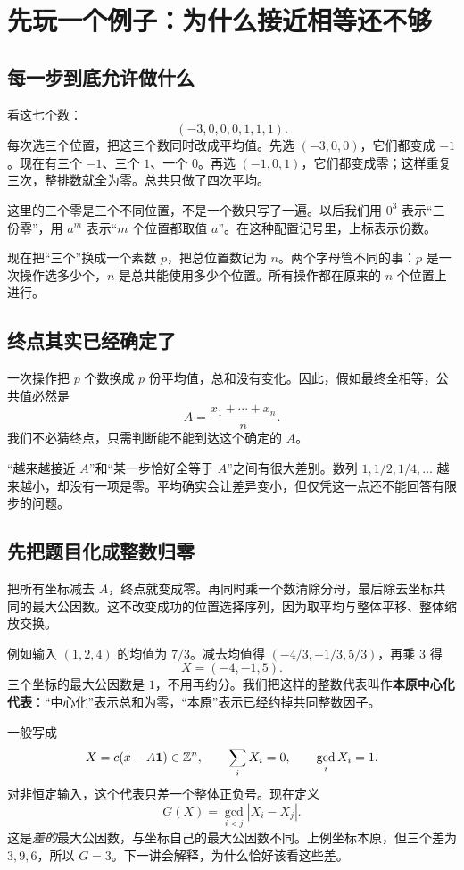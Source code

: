 \chapter{先玩一个例子：为什么接近相等还不够}\label{sec:main}
\section{每一步到底允许做什么}
看这七个数：
\[(-3,0,0,0,1,1,1).
\]
每次选三个位置，把这三个数同时改成平均值。先选 $(-3,0,0)$，它们都变成 $-1$。现在有三个 $-1$、三个 $1$、一个 $0$。再选 $(-1,0,1)$，它们都变成零；这样重复三次，整排数就全为零。总共只做了四次平均。

这里的三个零是三个不同位置，不是一个数只写了一遍。以后我们用 $0^3$ 表示“三份零”，用 $a^m$ 表示“$m$ 个位置都取值 $a$”。在这种配置记号里，上标表示份数。

现在把“三个”换成一个素数 $p$，把总位置数记为 $n$。两个字母管不同的事：$p$ 是一次操作选多少个，$n$ 是总共能使用多少个位置。所有操作都在原来的 $n$ 个位置上进行。

\section{终点其实已经确定了}
一次操作把 $p$ 个数换成 $p$ 份平均值，总和没有变化。因此，假如最终全相等，公共值必然是
\[A=\frac{x_1+\cdots+x_n}{n}.
\]
我们不必猜终点，只需判断能不能到达这个确定的 $A$。

“越来越接近 $A$”和“某一步恰好全等于 $A$”之间有很大差别。数列 $1,1/2,1/4,\ldots$ 越来越小，却没有一项是零。平均确实会让差异变小，但仅凭这一点还不能回答有限步的问题。

\section{先把题目化成整数归零}
把所有坐标减去 $A$，终点就变成零。再同时乘一个数清除分母，最后除去坐标共同的最大公因数。这不改变成功的位置选择序列，因为取平均与整体平移、整体缩放交换。

例如输入 $(1,2,4)$ 的均值为 $7/3$。减去均值得 $(-4/3,-1/3,5/3)$，再乘 $3$ 得
\[X=(-4,-1,5).
\]
三个坐标的最大公因数是 $1$，不用再约分。我们把这样的整数代表叫作\textbf{本原中心化代表}：“中心化”表示总和为零，“本原”表示已经约掉共同整数因子。

一般写成
\[X=c(x-A\mathbf1)\in\mathbb Z^n,\qquad \sum_iX_i=0,\qquad\gcd_iX_i=1.
\]
对非恒定输入，这个代表只差一个整体正负号。现在定义
\begin{equation}\label{eq:G}
G(X)=\gcd_{i<j}|X_i-X_j|.
\end{equation}
这是\emph{差的}最大公因数，与坐标自己的最大公因数不同。上例坐标本原，但三个差为 $3,9,6$，所以 $G=3$。下一讲会解释，为什么恰好该看这些差。

